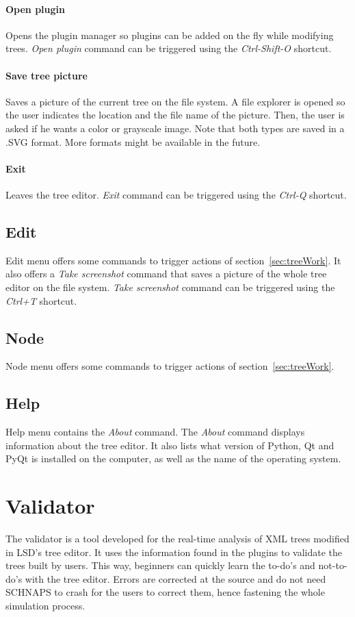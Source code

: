 \documentclass[a4paper,11pt]{report}
\begin{document}
\paragraph{Open plugin} Opens the plugin manager so plugins can be added on the fly while modifying trees. \emph{Open plugin} command can be triggered using the \emph{Ctrl-Shift-O} shortcut.

\paragraph{Save tree picture}Saves a picture of the current tree on the file system. A file explorer is opened so the user indicates the location and the file name of the picture. Then, the user is asked if he wants a color or grayscale image. Note that both types are saved in a .SVG format. More formats might be available in the future.

\paragraph{Exit}Leaves the tree editor. \emph{Exit} command can be triggered using the \emph{Ctrl-Q} shortcut.

\subsection{Edit}
Edit menu offers some commands to trigger actions of section~\ref{sec:treeWork}. It also offers a \emph{Take screenshot} command that saves a picture of the whole tree editor on the file system. \emph{Take screenshot} command can be triggered using the \emph{Ctrl+T} shortcut.

\subsection{Node}
Node menu offers some commands to trigger actions of section~\ref{sec:treeWork}.

\subsection{Help}
Help menu contains the \emph{About} command. The \emph{About} command displays information about the tree editor. It also lists what version of Python, Qt and PyQt is installed on the computer, as well as the name of the operating system.

\section{Validator}
\label{sec:validator}
The validator is a tool developed for the real-time analysis of XML trees modified in LSD's tree editor. It uses the information found in the plugins to validate the trees built by users. This way, beginners can quickly learn the to-do's and not-to-do's with the tree editor. Errors are corrected at the source and do not need SCHNAPS to crash for the users to correct them, hence fastening the whole simulation process. 
\end{document}

